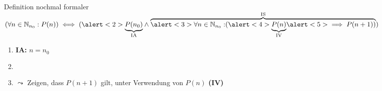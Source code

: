 \begin{frame}{Definition nochmal formaler}
    $(\forall n \in \mathbb{N}_{n_0}: P(n)) \iff (\alert<2>{\underbrace{P(n_0)}_{\text{IA}}}\wedge \overbrace{\alert<3>{\forall n \in \mathbb{N}_{n_0}:} (\alert<4>{\underbrace{P(n)}_{\text{IV}}} \alert<5>{\implies P(n+1)})}^{\text{IS}})$
    \begin{enumerate}
        \item<2->\alert<2>{\textbf{IA:} $n = n_0$}
        \item<3->
        \item<5->\alert{$\leadsto$ Zeigen, dass $P(n+1)$ gilt, unter Verwendung von $P(n)$ \tiny{\textbf{(IV)}}}
    \end{enumerate}
\end{frame}




